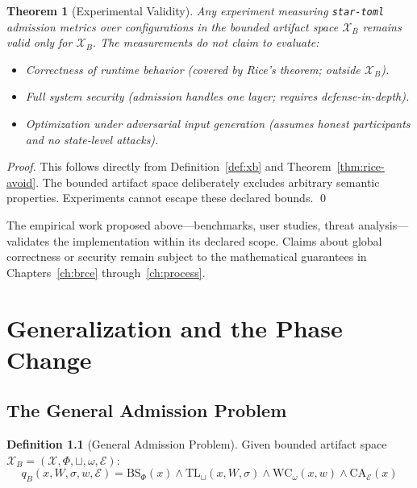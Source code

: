 \documentclass[12pt, letterpaper]{report}
\theoremstyle{plain}
\newtheorem{theorem}{Theorem}[chapter]
\theoremstyle{definition}
\newtheorem{definition}[theorem]{Definition}
\theoremstyle{remark}
\newcommand{\EE}{\mathcal{E}}
\begin{document}
\begin{theorem}[Experimental Validity]
\label{thm:experiment-validity}
Any experiment measuring \texttt{star-toml} admission metrics over
configurations in the bounded artifact space $\mathcal{X}_B$
remains valid only for $\mathcal{X}_B$.
The measurements do not claim to evaluate:
\begin{itemize}
  \item Correctness of runtime behavior (covered by Rice's theorem;
        outside $\mathcal{X}_B$).
  \item Full system security (admission handles one layer; requires
        defense-in-depth).
  \item Optimization under adversarial input generation
        (assumes honest participants and no state-level attacks).
\end{itemize}
\end{theorem}

\begin{proof}
This follows directly from Definition~\ref{def:xb} and Theorem~\ref{thm:rice-avoid}.
The bounded artifact space deliberately excludes arbitrary semantic properties.
Experiments cannot escape these declared bounds. \qed
\end{proof}

The empirical work proposed above---benchmarks, user studies, threat analysis---
validates the implementation within its declared scope. Claims about global
correctness or security remain subject to the mathematical guarantees in
Chapters~\ref{ch:brce} through~\ref{ch:process}.

\chapter{Generalization and the Phase Change}
\label{ch:generalization}

\section{The General Admission Problem}

\begin{definition}[General Admission Problem]
\label{def:general}
Given bounded artifact space $\mathcal{X}_B = (\mathcal{X}, \Phi, \sqcup, \omega, \EE)$:
\[
  q_B(x, W, \sigma, w, \EE) =
  \mathrm{BS}_\Phi(x) \wedge \mathrm{TL}_\sqcup(x, W, \sigma)
  \wedge \mathrm{WC}_\omega(x, w) \wedge \mathrm{CA}_\EE(x)
\]
\end{definition}
\end{document}
